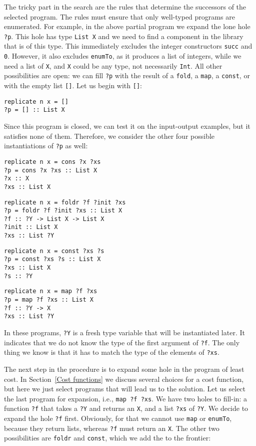 The tricky part in the search are the rules that determine the successors of the selected program.  The rules must ensure that only well-typed programs are enumerated.  For example, in the above partial program we expand the lone hole \lstinline|?p|.  This hole has type \lstinline|List X| and we need to find a component in the library that is of this type.  This immediately excludes the integer constructors \lstinline|succ| and \lstinline|0|.  However, it also excludes \lstinline|enumTo|, as it produces a list of integers, while we need a list of \lstinline|X|, and \lstinline|X| could be any type, not necessarily \lstinline|Int|.  All other possibilities are open: we can fill \lstinline|?p| with the result of a \lstinline|fold|, a \lstinline|map|, a \lstinline|const|, or with the empty list \lstinline|[]|.  Let us begin with \lstinline|[]|:
\begin{lstlisting}[style=plain]
replicate n x = []
?p = [] :: List X
\end{lstlisting}

Since this program is closed, we can test it on the input-output examples, but it satisfies none of them.  Therefore, we consider the other four possible instantiations of \lstinline!?p! as well:
\begin{lstlisting}[style=plain]
replicate n x = cons ?x ?xs
?p = cons ?x ?xs :: List X
?x :: X
?xs :: List X
\end{lstlisting}
\begin{lstlisting}[style=plain]
replicate n x = foldr ?f ?init ?xs
?p = foldr ?f ?init ?xs :: List X
?f :: ?Y -> List X -> List X
?init :: List X
?xs :: List ?Y
\end{lstlisting}
\begin{lstlisting}[style=plain]
replicate n x = const ?xs ?s
?p = const ?xs ?s :: List X
?xs :: List X
?s :: ?Y
\end{lstlisting}
\begin{lstlisting}[style=plain]
replicate n x = map ?f ?xs
?p = map ?f ?xs :: List X
?f :: ?Y -> X
?xs :: List ?Y
\end{lstlisting}
In these programs, \lstinline!?Y! is a fresh type variable that will be instantiated later.  It indicates that we do not know the type of the first argument of \lstinline!?f!. The only thing we know is that it has to match the type of the elements of \lstinline!?xs!.

The next step in the procedure is to expand some hole in the program of least cost.  In Section~\ref{Cost functions} we discuss several choices for a cost function, but here we just select programs that will lead us to the solution.  Let us select the last program for expansion, i.e., \lstinline|map ?f ?xs|.  We have two holes to fill-in: a function \lstinline!?f! that takes a \lstinline|?Y| and returns an \lstinline|X|, and a list \lstinline!?xs! of \lstinline|?Y|.  We decide to expand the hole \lstinline|?f| first.  Obviously, for that we cannot use \lstinline|map| or \lstinline|enumTo|, because they return lists, whereas \lstinline|?f| must return an \lstinline|X|.  The other two possibilities are \lstinline|foldr| and \lstinline|const|, which we add the to the frontier:

